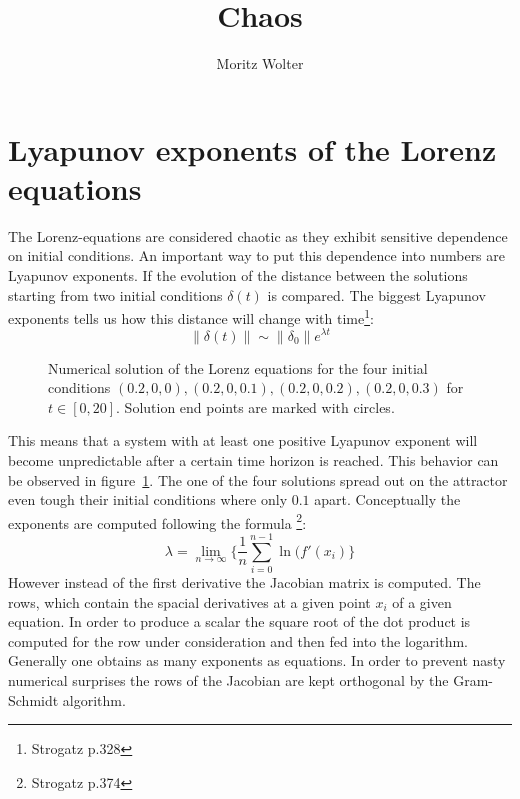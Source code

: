




\title{Chaos}
\author{Moritz Wolter}

\maketitle

\section{Lyapunov exponents of the Lorenz equations}
The Lorenz-equations are considered chaotic as they exhibit sensitive dependence on initial conditions. An important way to put this dependence into numbers are Lyapunov exponents. If the evolution of the distance between the solutions starting from two initial conditions $\delta(t)$ is compared. The biggest Lyapunov exponents tells us how this distance will change with time\footnote{Strogatz p.328}:
\begin{equation}
\| \delta(t) \| \sim \| \delta_0 \| e^{\lambda t}
\end{equation} 
\begin{figure}
\centering

\caption{Numerical solution of the Lorenz equations for the four initial conditions $(0.2, 0, 0), (0.2, 0, 0.1), (0.2, 0, 0.2), (0.2, 0, 0.3)$ for $t \in [0, 20]$. Solution end points are marked with circles.}
\label{fig:lorenz4}
\end{figure}
This means that a system with at least one positive Lyapunov exponent will become unpredictable after a certain time horizon is reached. This behavior can be observed in figure~\ref{fig:lorenz4}. The one of the four solutions spread out on the attractor even tough their initial conditions where only $0.1$ apart.
Conceptually the exponents are computed following the formula \footnote{Strogatz p.374}:
\begin{equation}
\lambda = \lim_{n \rightarrow \infty}\{\frac{1}{n} \sum_{i=0}^{n-1}\ln(f'(x_i)\}
\end{equation}
However instead of the first derivative the Jacobian matrix is computed. The rows, which contain the spacial derivatives at a given point $x_i$ of a given equation. In order to produce a scalar the square root of the dot product is computed for the row under consideration and then fed into the logarithm. Generally one obtains as many exponents as equations. In order to prevent nasty numerical surprises the rows of the Jacobian are kept orthogonal by the Gram-Schmidt algorithm.

